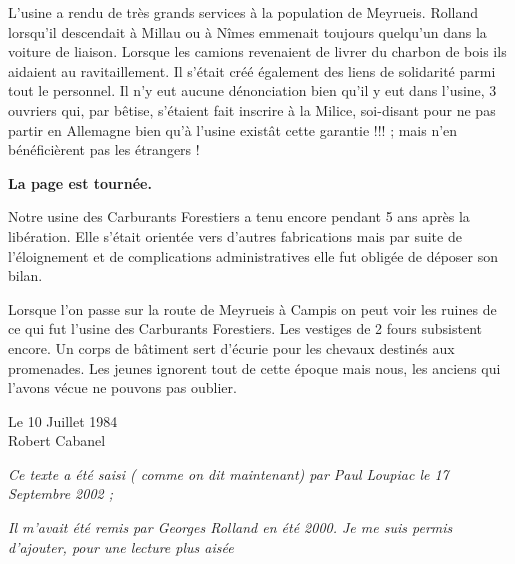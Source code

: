 \vspace{0.35cm}

L’usine a rendu de très grands services à la population de Meyrueis. Rolland lorsqu’il
descendait à Millau ou à Nîmes emmenait toujours quelqu’un dans la voiture de liaison.
Lorsque les camions revenaient de livrer du charbon de bois ils aidaient au ravitaillement. Il
s’était créé également des liens de solidarité parmi tout le personnel. Il n’y eut aucune
dénonciation bien qu’il y eut dans l’usine, 3 ouvriers qui, par bêtise, s’étaient fait inscrire à la
Milice, soi-disant pour ne pas partir en Allemagne bien qu’à l’usine existât cette garantie !!! ;
mais n’en bénéficièrent pas les étrangers !

\vspace{0.55cm}

\textbf{La page est tournée.}

\vspace{0.35cm}

Notre usine des Carburants Forestiers a tenu encore pendant 5 ans après la libération. Elle
s’était orientée vers d’autres fabrications mais par suite de l’éloignement et de complications
administratives elle fut obligée de déposer son bilan.


Lorsque l’on passe sur la route de Meyrueis à Campis on peut voir les ruines de ce qui fut
l’usine des Carburants Forestiers. Les vestiges de 2 fours subsistent encore. Un corps de
bâtiment sert d’écurie pour les chevaux destinés aux promenades. Les jeunes ignorent tout de
cette époque mais nous, les anciens qui l’avons vécue ne pouvons pas oublier.

\vspace{0.8cm}

\begin{flushright}
Le 10 Juillet 1984\\
Robert Cabanel
\end{flushright}

\vfill

\textit{Ce texte a été saisi ( comme on dit maintenant) par Paul Loupiac le 17 Septembre 2002 ;}

\vspace{0.3cm}

\textit{Il m’avait été remis par Georges Rolland en été 2000. Je me suis permis d’ajouter, pour une lecture
plus aisée}

